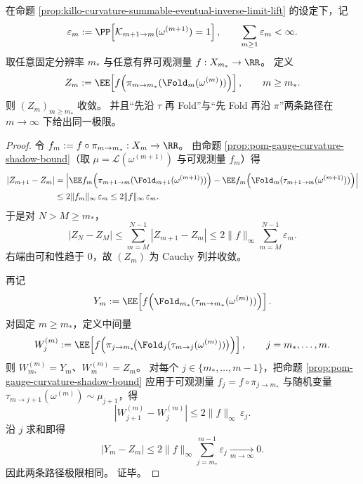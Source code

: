 \begin{theorem}[曲率概率控制跨分辨率观测极限一致性]\label{thm:killo-curvature-probability-observable-limit-consistency}
在命题 \ref{prop:killo-curvature-summable-eventual-inverse-limit-lift} 的设定下，记
\[
\varepsilon_m:=\PP\!\left[\mathcal K_{m+1\to m}(\omega^{(m+1)})=1\right],\qquad
\sum_{m\ge 1}\varepsilon_m<\infty.
\]
取任意固定分辨率 \(m_\ast\) 与任意有界可观测量 \(f:X_{m_\ast}\to\RR\)。
定义
\[
Z_m:=\EE\!\left[f\!\left(\pi_{m\to m_\ast}(\Fold_m(\omega^{(m)}))\right)\right],\qquad m\ge m_\ast.
\]
则 \((Z_m)_{m\ge m_\ast}\) 收敛。
并且“先沿 \(\tau\) 再 Fold”与“先 Fold 再沿 \(\pi\)”两条路径在 \(m\to\infty\) 下给出同一极限。
\end{theorem}
\begin{proof}
令 \(f_m:=f\circ \pi_{m\to m_\ast}:X_m\to\RR\)。
由命题 \ref{prop:pom-gauge-curvature-shadow-bound}（取 \(\mu=\mathcal L(\omega^{(m+1)})\) 与可观测量 \(f_m\)）得
\[
\begin{aligned}
|Z_{m+1}-Z_m|
&=
\left|
\EE f_m\!\left(\pi_{m+1\to m}(\Fold_{m+1}(\omega^{(m+1)}))\right)
-\EE f_m\!\left(\Fold_m(\tau_{m+1\to m}(\omega^{(m+1)}))\right)
\right|\\
&\le 2\|f_m\|_\infty\,\varepsilon_m
\le 2\|f\|_\infty\,\varepsilon_m.
\end{aligned}
\]
于是对 \(N>M\ge m_\ast\)，
\[
|Z_N-Z_M|
\le
\sum_{m=M}^{N-1}|Z_{m+1}-Z_m|
\le
2\|f\|_\infty\sum_{m=M}^{N-1}\varepsilon_m.
\]
右端由可和性趋于 \(0\)，故 \((Z_m)\) 为 Cauchy 列并收敛。

再记
\[
Y_m:=\EE\!\left[f\!\left(\Fold_{m_\ast}(\tau_{m\to m_\ast}(\omega^{(m)}))\right)\right].
\]
对固定 \(m\ge m_\ast\)，定义中间量
\[
W^{(m)}_j:=
\EE\!\left[
f\!\left(\pi_{j\to m_\ast}\!\bigl(\Fold_j(\tau_{m\to j}(\omega^{(m)}))\bigr)\right)
\right],
\qquad
j=m_\ast,\dots,m.
\]
则 \(W^{(m)}_{m_\ast}=Y_m\)、\(W^{(m)}_m=Z_m\)。
对每个 \(j\in\{m_\ast,\dots,m-1\}\)，把命题 \ref{prop:pom-gauge-curvature-shadow-bound} 应用于可观测量 \(f_j=f\circ\pi_{j\to m_\ast}\) 与随机变量 \(\tau_{m\to j+1}(\omega^{(m)})\sim\mu_{j+1}\)，得
\[
\left|W^{(m)}_{j+1}-W^{(m)}_j\right|
\le 2\|f\|_\infty\,\varepsilon_j.
\]
沿 \(j\) 求和即得
\[
|Y_m-Z_m|
\le
2\|f\|_\infty\sum_{j=m_\ast}^{m-1}\varepsilon_j
\xrightarrow[m\to\infty]{}0.
\]
因此两条路径极限相同。
证毕。
\end{proof}

